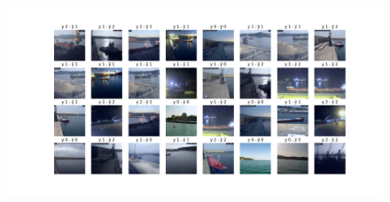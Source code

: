 \documentclass{article}
\begin{document}
\begin{figure}[H]
    \begin{minipage}{0.7\textwidth}
        \centering
        \includegraphics[width=\linewidth]{../figures/GRID__A_False_P_False_D_True_MLP_True_efficientnet_b4.png}
    \end{minipage}
\end{figure}
\end{document}
